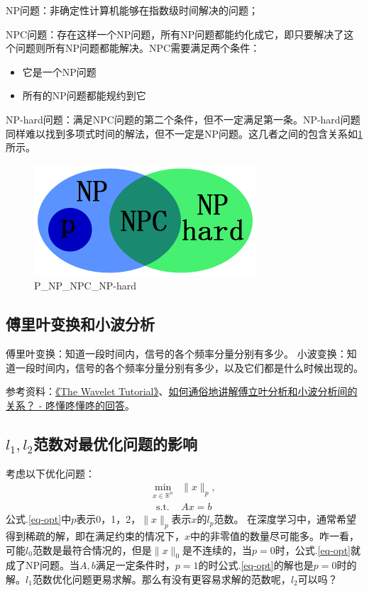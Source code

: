 NP问题：非确定性计算机能够在指数级时间解决的问题；

NPC问题：存在这样一个NP问题，所有NP问题都能约化成它，即只要解决了这个问题则所有NP问题都能解决。NPC需要满足两个条件：
\begin{itemize}
	\item 它是一个NP问题
	\item 所有的NP问题都能规约到它
\end{itemize}

NP-hard问题：满足NPC问题的第二个条件，但不一定满足第一条。NP-hard问题同样难以找到多项式时间的解法，但不一定是NP问题。这几者之间的包含关系如\ref{fig:P-NP-NPC-NP-hard}所示。

\begin{figure}[h]
	\centering
	\includegraphics[width=.4\textwidth]{pics/P-NP-NPC-NP-hard.jpeg}
	\caption{P\_NP\_NPC\_NP-hard}
	\label{fig:P-NP-NPC-NP-hard}
\end{figure}



\subsection{傅里叶变换和小波分析}
傅里叶变换：知道一段时间内，信号的各个频率分量分别有多少。
小波变换：知道一段时间内，信号的各个频率分量分别有多少，以及它们都是什么时候出现的。

参考资料：\href{https://cseweb.ucsd.edu/~baden/Doc/wavelets/polikar_wavelets.pdf}{《The Wavelet Tutorial》}、\href{https://www.zhihu.com/question/22864189/answer/40772083}{如何通俗地讲解傅立叶分析和小波分析间的关系？ - 咚懂咚懂咚的回答}。

\subsection{$l_1, l_2$范数对最优化问题的影响}
考虑以下优化问题：
\begin{equation}
	\begin{aligned}
		\min _{x \in \mathbb{R}^{n}} &\|x\|_{p}, \\
		\text { s.t. } & A x=b \label{eq-opt}
	\end{aligned}
\end{equation}
公式.\ref{eq-opt}中$p$表示0，1，2，$\|x\|_{p}$表示$x$的$l_p$范数。
在深度学习中，通常希望得到稀疏的解，即在满足约束的情况下，$x$中的非零值的数量尽可能多。咋一看，可能$l_0$范数是最符合情况的，但是$\|x\|_0$是不连续的，当$p=0$时，公式.\ref{eq-opt}就成了NP问题。当$A, b$满足一定条件时，$p=1$的时公式.\ref{eq-opt}的解也是$p=0$时的解。$l_1$范数优化问题更易求解。那么有没有更容易求解的范数呢，$l_2$可以吗？

